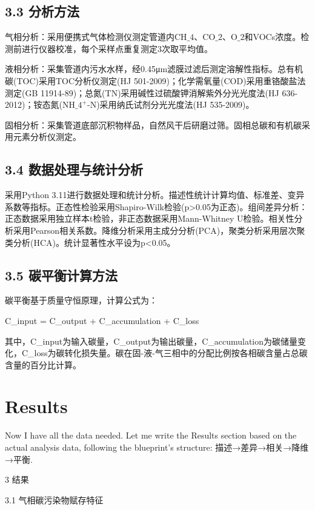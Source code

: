 \documentclass[12pt]{article}
\begin{document}
\subsection{3.3 分析方法}

气相分析：采用便携式气体检测仪测定管道内CH$\_4$、CO$\_2$、O$\_2$和VOCs浓度。检测前进行仪器校准，每个采样点重复测定3次取平均值。

液相分析：采集管道内污水水样，经0.45μm滤膜过滤后测定溶解性指标。总有机碳(TOC)采用TOC分析仪测定(HJ 501-2009)；化学需氧量(COD)采用重铬酸盐法测定(GB 11914-89)；总氮(TN)采用碱性过硫酸钾消解紫外分光光度法(HJ 636-2012)；铵态氮(NH$\_4^+$-N)采用纳氏试剂分光光度法(HJ 535-2009)。

固相分析：采集管道底部沉积物样品，自然风干后研磨过筛。固相总碳和有机碳采用元素分析仪测定。

\subsection{3.4 数据处理与统计分析}

采用Python 3.11进行数据处理和统计分析。描述性统计计算均值、标准差、变异系数等指标。正态性检验采用Shapiro-Wilk检验(p>0.05为正态)。组间差异分析：正态数据采用独立样本t检验，非正态数据采用Mann-Whitney U检验。相关性分析采用Pearson相关系数。降维分析采用主成分分析(PCA)，聚类分析采用层次聚类分析(HCA)。统计显著性水平设为p<0.05。

\subsection{3.5 碳平衡计算方法}

碳平衡基于质量守恒原理，计算公式为：

C\_input = C\_output + C\_accumulation + C\_loss

其中，C\_input为输入碳量，C\_output为输出碳量，C\_accumulation为碳储量变化，C\_loss为碳转化损失量。碳在固-液-气三相中的分配比例按各相碳含量占总碳含量的百分比计算。

\section{Results}
\label{sec:results}

Now I have all the data needed. Let me write the Results section based on the actual analysis data, following the blueprint's structure: 描述→差异→相关→降维→平衡.

3 结果

3.1 气相碳污染物赋存特征
\end{document}
